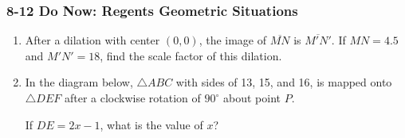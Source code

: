 \documentclass[12pt, twoside]{article}
\begin{document}
\subsubsection*{8-12 Do Now: Regents Geometric Situations}
  \begin{enumerate}

  \item After a dilation with center $(0,0)$, the image of $\overline{MN}$ is $\overline{M'N'}$. If $MN=4.5$ and $M'N'=18$, find the scale factor of this dilation. \vspace{3cm}

  \item In the diagram below, $\triangle ABC$ with sides of 13, 15, and 16, is mapped onto $\triangle DEF$ after a clockwise rotation of $90^\circ$ about point $P$.
      \begin{center}
      \end{center}
    If $DE=2x-1$, what is the value of $x$? \vspace{2cm}


\end{enumerate}
\end{document}
